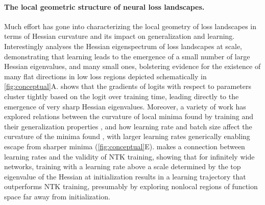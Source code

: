 \documentclass{article}
\begin{document}
\vspace{-0.3cm}
\paragraph{The local geometric structure of neural loss landscapes.}  
Much effort has gone into characterizing the local geometry of loss landscapes in terms of Hessian curvature and its impact on generalization and learning.  
Interestingly \cite{papyan2019measurements} analyses the Hessian eigenspectrum of loss landscapes at scale, demonstrating that learning leads to the emergence of a small number of large Hessian eigenvalues, and many small ones, bolstering evidence for the existence of many flat directions in low loss regions depicted schematically in \cref{fig:conceptual}A.
\cite{fort2019emergent} shows that the gradients of logits with respect to parameters cluster tightly based on the logit over training time, leading directly to the emergence of very sharp Hessian eigenvalues.  
Moreover, a variety of work has explored relations between the curvature of local minima found by training and their generalization properties \citep{dziugaite2017computing,chaudhari2019entropy,langford2002bounding,hochreiter1997flat,keskar2016large,fort2019large, fort2018goldilocks}, and how learning rate and batch size affect the curvature of the minima found \citep{jastrzbski2017factors, sagun2017empirical, NIPS2018_8049},  with larger learning rates generically enabling escape from sharper minima (\cref{fig:conceptual}E).  
\cite{lewkowycz2020large} makes a connection between learning rates and the validity of NTK training, showing that for infinitely wide networks, training with a learning rate above a scale determined by the top eigenvalue of the Hessian at initialization results in a learning trajectory that outperforms NTK training, presumably by exploring nonlocal regions of function space far away from initialization. 

\vspace{-0.3cm}
\end{document}
